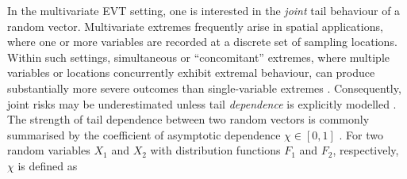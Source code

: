 \documentclass[12pt,compact]{article}
\begin{document}
In the multivariate EVT setting, one is interested in the \emph{joint} tail behaviour of a random vector.
Multivariate extremes frequently arise in spatial applications, where one or more variables are recorded at a discrete set of sampling locations.
Within such settings, simultaneous or ``concomitant'' extremes, where multiple variables or locations concurrently exhibit extremal behaviour, can produce substantially more severe outcomes than single-variable extremes \citep{zscheischler2018future, bevacqua2021guidelines, Rohrbeck2021, Sando2022}.
Consequently, joint risks may be underestimated unless tail \emph{dependence} is explicitly modelled \citep{Zhang2024}. 
The strength of tail dependence between two random vectors is commonly summarised by the coefficient of asymptotic dependence \(\chi\in[0,1]\) \citep[see e.g.,][]{Coles1999}.
For two random variables $X_1$ and $X_2$ with distribution functions $F_1$ and $F_2$, respectively, $\chi$ is defined as
\end{document}
